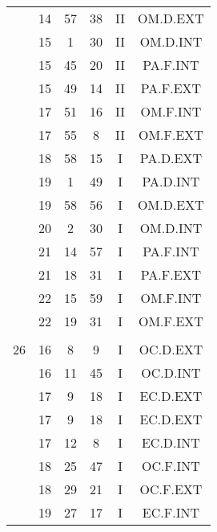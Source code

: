 \documentclass[12pt, a4paper]{article}
\begin{document}
\begin{multicols}{3}
{\begin{tabular}{c c c c c c}
	 	 	 	 & 14 & 57 & 38 & II & OM.D.EXT\\%
	 	 	 	 & 15 & 1 & 30 & II & OM.D.INT\\%
	 	 	 	 & 15 & 45 & 20 & II & PA.F.INT\\%
	 	 	 	 & 15 & 49 & 14 & II & PA.F.EXT\\%
	 	 	 	 & 17 & 51 & 16 & II & OM.F.INT\\%
	 	 	 	 & 17 & 55 & 8 & II & OM.F.EXT\\%
	 	 	 	 & 18 & 58 & 15 & I & PA.D.EXT\\%
	 	 	 	 & 19 & 1 & 49 & I & PA.D.INT\\%
	 	 	 	 & 19 & 58 & 56 & I & OM.D.EXT\\%
	 	 	 	 & 20 & 2 & 30 & I & OM.D.INT\\%
	 	 	 	 & 21 & 14 & 57 & I & PA.F.INT\\%
	 	 	 	 & 21 & 18 & 31 & I & PA.F.EXT\\%
	 	 	 	 & 22 & 15 & 59 & I & OM.F.INT\\%
	 	 	 	 & 22 & 19 & 31 & I & OM.F.EXT\\%
	 	 	 	 & & & & & \\%
	 	 	 	26 & 16 & 8 & 9 & I & OC.D.EXT\\%
	 	 	 	 & 16 & 11 & 45 & I & OC.D.INT\\%
	 	 	 	 & 17 & 9 & 18 & I & EC.D.EXT\\%
	 	 	 	 & 17 & 9 & 18 & I & EC.D.EXT\\%
	 	 	 	 & 17 & 12 & 8 & I & EC.D.INT\\%
	 	 	 	 & 18 & 25 & 47 & I & OC.F.INT\\%
	 	 	 	 & 18 & 29 & 21 & I & OC.F.EXT\\%
	 	 	 	 & 19 & 27 & 17 & I & EC.F.INT\\%

\end{tabular}}
\end{multicols}
\end{document}
